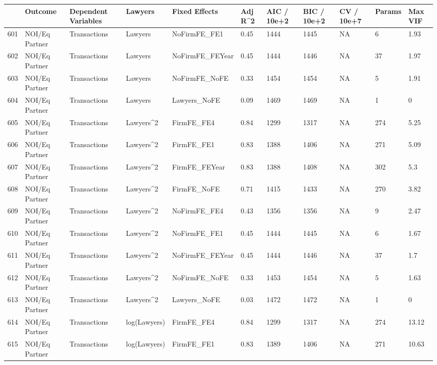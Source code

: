 \begin{table}[ht]
\centering
\begin{tabular}{rllllllllll}
  \hline
 & Outcome & Dependent Variables & Lawyers & Fixed Effects & Adj R^2 & AIC / 10e+2 & BIC / 10e+2 & CV / 10e+7 & Params & Max VIF \\ 
  \hline
601 & NOI/Eq Partner & Transactions & Lawyers & NoFirmFE\_FE1 & 0.45 & 1444 & 1445 & NA & 6 & 1.93 \\ 
  602 & NOI/Eq Partner & Transactions & Lawyers & NoFirmFE\_FEYear & 0.45 & 1444 & 1446 & NA & 37 & 1.97 \\ 
  603 & NOI/Eq Partner & Transactions & Lawyers & NoFirmFE\_NoFE & 0.33 & 1454 & 1454 & NA & 5 & 1.91 \\ 
  604 & NOI/Eq Partner & Transactions & Lawyers & Lawyers\_NoFE & 0.09 & 1469 & 1469 & NA & 1 & 0 \\ 
  605 & NOI/Eq Partner & Transactions & Lawyers^2 & FirmFE\_FE4 & 0.84 & 1299 & 1317 & NA & 274 & 5.25 \\ 
  606 & NOI/Eq Partner & Transactions & Lawyers^2 & FirmFE\_FE1 & 0.83 & 1388 & 1406 & NA & 271 & 5.09 \\ 
  607 & NOI/Eq Partner & Transactions & Lawyers^2 & FirmFE\_FEYear & 0.83 & 1388 & 1408 & NA & 302 & 5.3 \\ 
  608 & NOI/Eq Partner & Transactions & Lawyers^2 & FirmFE\_NoFE & 0.71 & 1415 & 1433 & NA & 270 & 3.82 \\ 
  609 & NOI/Eq Partner & Transactions & Lawyers^2 & NoFirmFE\_FE4 & 0.43 & 1356 & 1356 & NA & 9 & 2.47 \\ 
  610 & NOI/Eq Partner & Transactions & Lawyers^2 & NoFirmFE\_FE1 & 0.45 & 1444 & 1445 & NA & 6 & 1.67 \\ 
  611 & NOI/Eq Partner & Transactions & Lawyers^2 & NoFirmFE\_FEYear & 0.45 & 1444 & 1446 & NA & 37 & 1.7 \\ 
  612 & NOI/Eq Partner & Transactions & Lawyers^2 & NoFirmFE\_NoFE & 0.33 & 1453 & 1454 & NA & 5 & 1.63 \\ 
  613 & NOI/Eq Partner & Transactions & Lawyers^2 & Lawyers\_NoFE & 0.03 & 1472 & 1472 & NA & 1 & 0 \\ 
  614 & NOI/Eq Partner & Transactions & log(Lawyers) & FirmFE\_FE4 & 0.84 & 1299 & 1317 & NA & 274 & 13.12 \\ 
  615 & NOI/Eq Partner & Transactions & log(Lawyers) & FirmFE\_FE1 & 0.83 & 1389 & 1406 & NA & 271 & 10.63 \\ 

\end{tabular}
\end{table}
